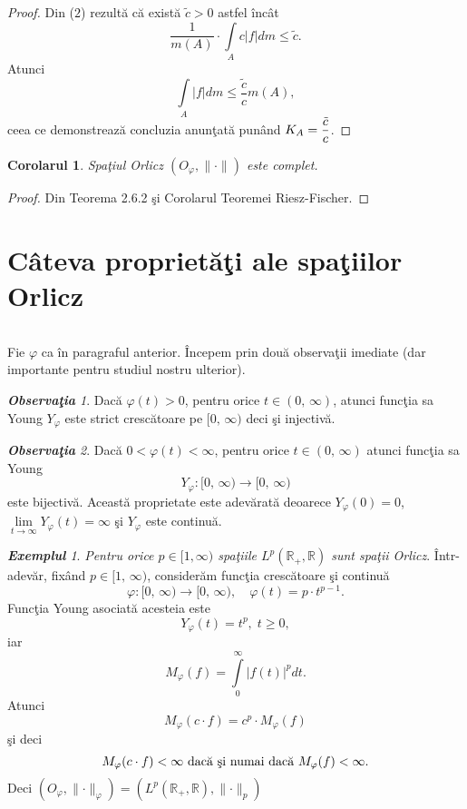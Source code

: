 \documentclass[ a4paper, 12pt]{report}
\newtheorem{cor}[theorem]{\bf Corolarul}
\theoremstyle{definition}
\theoremstyle{remark}
\newtheorem{obs}{\bf Observa\c tia }[section]
\newtheorem{exemple}{\bf Exemplul}[section]
\numberwithin{equation}{section}
\begin{document}
\begin{proof}
Din ($2$) rezult\u a c\u  a exist\u a $\tilde{c}>0$ astfel \^inc\^at
$$\frac{1}{m(A)} \cdot \int\limits_{A} c \lvert f \rvert dm \leq \tilde{c}.$$ Atunci
$$\int\limits_{A} \lvert f \rvert dm \leq \frac{\tilde{c}}{c} m(A),$$ ceea ce demonstreaz\u a concluzia anun\c tat\u a pun\^ and $K_A  = \displaystyle\frac{\tilde{c}}{c}$.
\end{proof}


\begin{cor}
Spa\c tiul Orlicz $(O_\varphi,\lVert \cdot \rVert)$ este complet.
\end{cor}

\begin{proof}
Din Teorema 2.6.2 \c si Corolarul Teoremei Riesz-Fischer.
\end{proof}


\newpage



\section{C\^ ateva propriet\u a\c ti ale spa\c tiilor Orlicz}

$\, $

\vspace{1cm}

Fie $\varphi$ ca \^in paragraful anterior. \^ Incepem prin dou\u a observa\c tii imediate (dar importante pentru studiul nostru ulterior).
\begin{obs}
Dac\u a $\varphi(t)>0$, pentru orice $t \in (0,\, \infty)$, atunci func\c tia sa Young $Y_\varphi$ este strict cresc\u atoare pe $[0, \, \infty)$ deci \c si injectiv\u a.
\end{obs}

\begin{obs}
Dac\u a $0< \varphi(t) < \infty$, pentru orice $t\in (0, \, \infty)$ atunci func\c tia sa Young
$$Y_\varphi : [0,\, \infty) \rightarrow [0, \, \infty)$$ este bijectiv\u a. Aceast\u a proprietate este adev\u arat\u a deoarece
$Y_\varphi(0) = 0$, $\lim\limits_{t \rightarrow \infty} Y_\varphi(t) = \infty$ \c si $Y_\varphi$ este continu\u a.
\end{obs}

\begin{exemple}
\emph{Pentru orice $p \in [1,\infty)$ spa\c tiile  $L^p(\mathbb{R}_+, \mathbb{R})$ sunt spa\c tii Orlicz}. \^ Intr-adev\u ar, fix\^ and $p \in [1, \, \infty)$, consider\u am func\c tia cresc\u atoare \c si continu\u a
$$\varphi : [0,\, \infty) \rightarrow [0, \, \infty), \quad \varphi(t) = p \cdot t^{p-1}.$$ Func\c tia Young asociat\u a acesteia este
$$Y_\varphi(t) = t^p, \; t \geq 0,$$ iar
$$ M_\varphi(f) = \int\limits_{0}^{\infty}\lvert f(t) \rvert^p dt.$$ Atunci
$$M_\varphi(c \cdot f) = c^p \cdot M_\varphi(f)$$ \c si deci
$$M_\varphi(c \cdot f) < \infty \hbox{ dac\u a \c si numai dac\u a } M_\varphi(f) < \infty.$$
Deci
$(O_\varphi, \lVert \cdot \rVert_\varphi) = (L^p(\mathbb{R}_+, \mathbb{R}), \lVert \cdot \rVert_p)$
\end{exemple}
\end{document}
